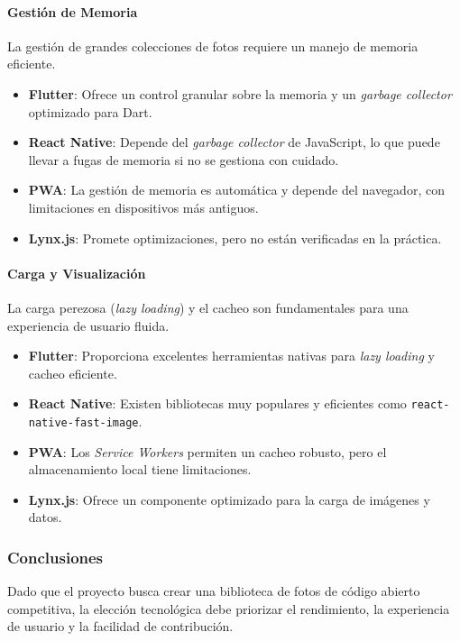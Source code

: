 \paragraph{Gestión de Memoria}
La gestión de grandes colecciones de fotos requiere un manejo de memoria eficiente.
\begin{itemize}
    \item \textbf{Flutter}: Ofrece un control granular sobre la memoria y un \textit{garbage collector} optimizado para Dart.
    \item \textbf{React Native}: Depende del \textit{garbage collector} de JavaScript, lo que puede llevar a fugas de memoria si no se gestiona con cuidado.
    \item \textbf{PWA}: La gestión de memoria es automática y depende del navegador, con limitaciones en dispositivos más antiguos.
    \item \textbf{Lynx.js}: Promete optimizaciones, pero no están verificadas en la práctica.
\end{itemize}

\paragraph{Carga y Visualización}
La carga perezosa (\textit{lazy loading}) y el cacheo son fundamentales para una experiencia de usuario fluida.
\begin{itemize}
    \item \textbf{Flutter}: Proporciona excelentes herramientas nativas para \textit{lazy loading} y cacheo eficiente.
    \item \textbf{React Native}: Existen bibliotecas muy populares y eficientes como \texttt{react-native-fast-image}.
    \item \textbf{PWA}: Los \textit{Service Workers} permiten un cacheo robusto, pero el almacenamiento local tiene limitaciones.
    \item \textbf{Lynx.js}: Ofrece un componente optimizado para la carga de imágenes y datos.
\end{itemize}

\subsubsection{Conclusiones}

Dado que el proyecto busca crear una biblioteca de fotos de código abierto competitiva, la elección tecnológica debe priorizar el rendimiento, la experiencia de usuario y la facilidad de contribución.

